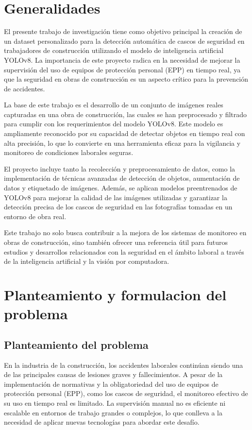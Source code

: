 \section{Generalidades}

El presente trabajo de investigación tiene como objetivo principal la creación de un dataset personalizado para la detección automática de cascos de seguridad en trabajadores de construcción utilizando el modelo de inteligencia artificial YOLOv8. La importancia de este proyecto radica en la necesidad de mejorar la supervisión del uso de equipos de protección personal (EPP) en tiempo real, ya que la seguridad en obras de construcción es un aspecto crítico para la prevención de accidentes.

La base de este trabajo es el desarrollo de un conjunto de imágenes reales capturadas en una obra de construcción, las cuales se han preprocesado y filtrado para cumplir con los requerimientos del modelo YOLOv8. Este modelo es ampliamente reconocido por su capacidad de detectar objetos en tiempo real con alta precisión, lo que lo convierte en una herramienta eficaz para la vigilancia y monitoreo de condiciones laborales seguras.

El proyecto incluye tanto la recolección y preprocesamiento de datos, como la implementación de técnicas avanzadas de detección de objetos, aumentación de datos y etiquetado de imágenes. Además, se aplican modelos preentrenados de YOLOv8 para mejorar la calidad de las imágenes utilizadas y garantizar la detección precisa de los cascos de seguridad en las fotografías tomadas en un entorno de obra real.

Este trabajo no solo busca contribuir a la mejora de los sistemas de monitoreo en obras de construcción, sino también ofrecer una referencia útil para futuros estudios y desarrollos relacionados con la seguridad en el ámbito laboral a través de la inteligencia artificial y la visión por computadora.

\section{Planteamiento y formulacion del problema}

\subsection{Planteamiento del problema}

En la industria de la construcción, los accidentes laborales continúan siendo una de las principales causas de lesiones graves y fallecimientos. A pesar de la implementación de normativas y la obligatoriedad del uso de equipos de protección personal (EPP), como los cascos de seguridad, el monitoreo efectivo de su uso en tiempo real es limitado. La supervisión manual no es eficiente ni escalable en entornos de trabajo grandes o complejos, lo que conlleva a la necesidad de aplicar nuevas tecnologías para abordar este desafío.

